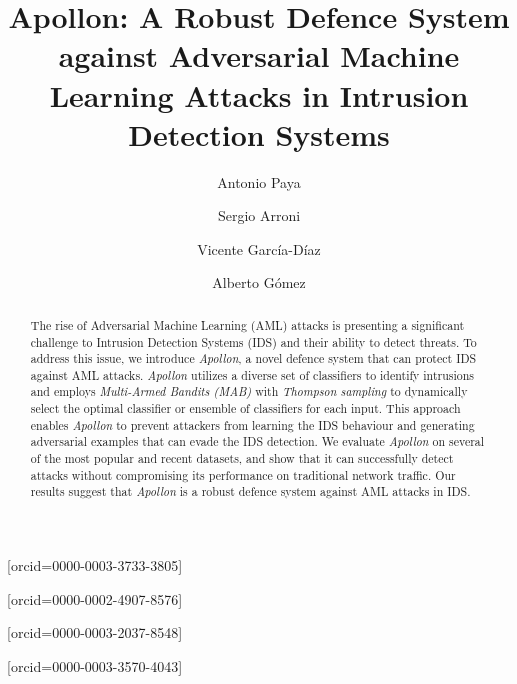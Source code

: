 \documentclass[a4paper,fleqn]{cas-dc}
\begin{document}

    \title [mode = title]{Apollon: A Robust Defence System against Adversarial Machine Learning Attacks in Intrusion Detection Systems}


    \author[uniovi]{Antonio Paya}[orcid=0000-0003-3733-3805]\cormark[1]

    \author[uniovi]{Sergio Arroni}[orcid=0000-0002-4907-8576]

    \author[uniovi]{Vicente García-Díaz}[orcid=0000-0003-2037-8548]

    \author[epi]{Alberto Gómez}[orcid=0000-0003-3570-4043]

    \address[uniovi]{Department of Computer Science,
        University of Oviedo, Science Faculty, Oviedo, Spain}
    \address[epi]{Department of Business Administration, University of Oviedo, Gijón, Spain}

    \begin{abstract}
        The rise of Adversarial Machine Learning (AML) attacks is presenting a significant challenge to Intrusion Detection
        Systems (IDS) and their ability to detect threats.
        To address this issue, we introduce \textit{Apollon}, a novel defence system that can protect IDS against AML
        attacks.
        \textit{Apollon} utilizes a diverse set of classifiers to identify intrusions and employs
        \textit{Multi-Armed Bandits (MAB)} with \textit{Thompson sampling} to dynamically select the optimal classifier or
        ensemble of classifiers for each input.
        This approach enables \textit{Apollon} to prevent attackers from learning the IDS behaviour and generating
        adversarial examples that can evade the IDS detection.
        We evaluate \textit{Apollon} on several of the most popular and recent datasets, and show that it can successfully
        detect attacks without compromising its performance on traditional network traffic.
        Our results suggest that \textit{Apollon} is a robust defence system against AML attacks in IDS.
    \end{abstract}
\end{document}
